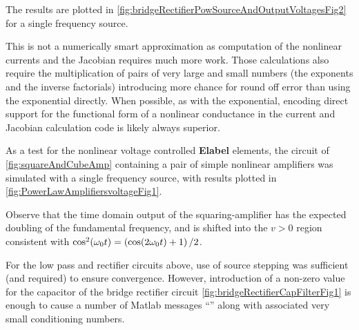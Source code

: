 The results are plotted in \cref{fig:bridgeRectifierPowSourceAndOutputVoltagesFig2} for a single frequency source.


This is not a numerically smart approximation as computation of the nonlinear currents and the Jacobian requires much more work.
Those calculations also require the multiplication of pairs of very large and small numbers (the exponents and the inverse factorials) introducing more chance for round off error than using the exponential directly.
When possible, as with the exponential, encoding direct support for the functional form of a nonlinear conductance in the current and Jacobian calculation code is likely always superior.

As a test for the nonlinear voltage controlled \textbf{Elabel} elements, the circuit of \cref{fig:squareAndCubeAmp} containing a pair of simple nonlinear amplifiers was simulated with a single frequency source, with results plotted in \cref{fig:PowerLawAmplifiersvoltageFig1}.



Observe that the time domain output of the squaring-amplifier
has the expected doubling of the fundamental frequency, and is shifted into the \( v > 0 \) region 
consistent with \( \cos^2(\omega_0 t) = \left(\cos(2 \omega_0 t) + 1\right)/2 \).


For the low pass and rectifier circuits above, use of source stepping was sufficient (and required) to ensure convergence.
However, introduction of a non-zero value for the capacitor of the bridge rectifier circuit \cref{fig:bridgeRectifierCapFilterFig1} is enough to cause a number of Matlab messages ``'' along with associated very small conditioning numbers.



